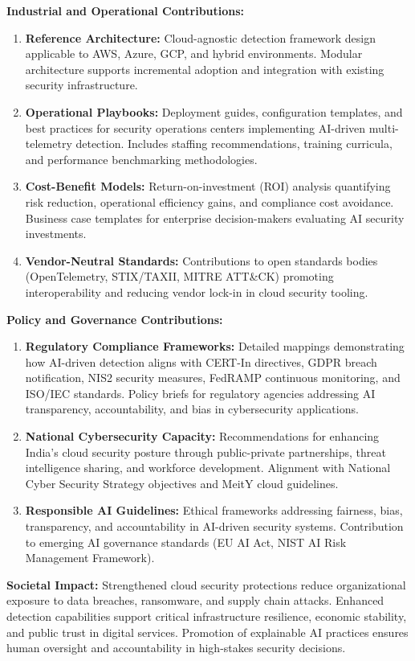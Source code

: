 \textbf{Industrial and Operational Contributions:}
\begin{enumerate}
    \item \textbf{Reference Architecture:} Cloud-agnostic detection framework design applicable to AWS, Azure, GCP, and hybrid environments. Modular architecture supports incremental adoption and integration with existing security infrastructure.
    \item \textbf{Operational Playbooks:} Deployment guides, configuration templates, and best practices for security operations centers implementing AI-driven multi-telemetry detection. Includes staffing recommendations, training curricula, and performance benchmarking methodologies.
    \item \textbf{Cost-Benefit Models:} Return-on-investment (ROI) analysis quantifying risk reduction, operational efficiency gains, and compliance cost avoidance. Business case templates for enterprise decision-makers evaluating AI security investments.
    \item \textbf{Vendor-Neutral Standards:} Contributions to open standards bodies (OpenTelemetry, STIX/TAXII, MITRE ATT\&CK) promoting interoperability and reducing vendor lock-in in cloud security tooling.
\end{enumerate}

\textbf{Policy and Governance Contributions:}
\begin{enumerate}
    \item \textbf{Regulatory Compliance Frameworks:} Detailed mappings demonstrating how AI-driven detection aligns with CERT-In directives, GDPR breach notification, NIS2 security measures, FedRAMP continuous monitoring, and ISO/IEC standards. Policy briefs for regulatory agencies addressing AI transparency, accountability, and bias in cybersecurity applications.
    \item \textbf{National Cybersecurity Capacity:} Recommendations for enhancing India's cloud security posture through public-private partnerships, threat intelligence sharing, and workforce development. Alignment with National Cyber Security Strategy objectives and MeitY cloud guidelines.
    \item \textbf{Responsible AI Guidelines:} Ethical frameworks addressing fairness, bias, transparency, and accountability in AI-driven security systems. Contribution to emerging AI governance standards (EU AI Act, NIST AI Risk Management Framework).
\end{enumerate}

\textbf{Societal Impact:}
Strengthened cloud security protections reduce organizational exposure to data breaches, ransomware, and supply chain attacks. Enhanced detection capabilities support critical infrastructure resilience, economic stability, and public trust in digital services. Promotion of explainable AI practices ensures human oversight and accountability in high-stakes security decisions.

